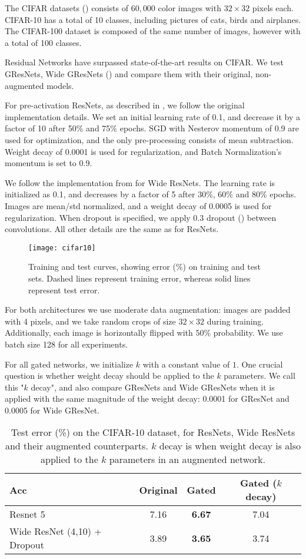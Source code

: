 \documentclass{article} \RequirePackage{amsmath,amsthm,amsfonts,amssymb}
\begin{document}
The CIFAR datasets (\cite{cifar}) consists of $60,000$ color images with $32 \times 32$ pixels each. CIFAR-10 has a total of 10 classes, including pictures of cats, birds and airplanes. The CIFAR-100 dataset is composed of the same number of images, however with a total of 100 classes.

Residual Networks have surpassed state-of-the-art results on CIFAR. We test GResNets, Wide GResNets (\cite{wide}) and compare them with their original, non-augmented models.

For pre-activation ResNets, as described in \cite{resnet2}, we follow the original implementation details. We set an initial learning rate of 0.1, and decrease it by a factor of 10 after 50\% and 75\% epochs. SGD with Nesterov momentum of 0.9 are used for optimization, and the only pre-processing consists of mean subtraction. Weight decay of 0.0001 is used for regularization, and Batch Normalization's momentum is set to 0.9.

We follow the implementation from \cite{wide} for Wide ResNets. The learning rate is initialized as 0.1, and decreases by a factor of 5 after 30\%, 60\% and 80\% epochs. Images are mean/std normalized, and a weight decay of 0.0005 is used for regularization. When dropout is specified, we apply 0.3 dropout (\cite{dropout}) between convolutions. All other details are the same as for ResNets.

\begin{figure}[!ht]
  \centering
    \texttt{[image: cifar10]}
  \caption{Training and test curves, showing error (\%) on training and test sets. Dashed lines represent training error, whereas solid lines represent test error.}
\label{cifar}
\end{figure}

For both architectures we use moderate data augmentation: images are padded with 4 pixels, and we take random  crops of size $32 \times 32$ during training. Additionally, each image is horizontally flipped with  $50\%$  probability. We use batch size 128 for all experiments.

For all gated networks, we initialize $k$ with a constant value of $1$. One crucial question is whether weight decay should be applied to the $k$ parameters. We call this "$k$ decay", and also compare GResNets and Wide GResNets when it is applied with the same magnitude of the weight decay: 0.0001 for GResNet and 0.0005 for Wide GResNet.

\begin{table}[h!]
\centering
    \begin{tabular}{ | l | c | c | c |}
    \hline
    Acc    & 		  Original & Gated & Gated ($k$ decay)  \\ \hline
    Resnet 5 & 		7.16 & 	\textbf{6.67} &    7.04\\ \hline
Wide ResNet (4,10) + Dropout &  3.89 & 	\textbf{3.65}   & 3.74 \\ \hline
    \end{tabular}
\caption{Test error (\%) on the CIFAR-10 dataset, for ResNets, Wide ResNets and their augmented counterparts. $k$ decay is when weight decay is also applied to the $k$ parameters in an augmented network.}
    \label{cifar_comp}   
\end{table}
\end{document}
